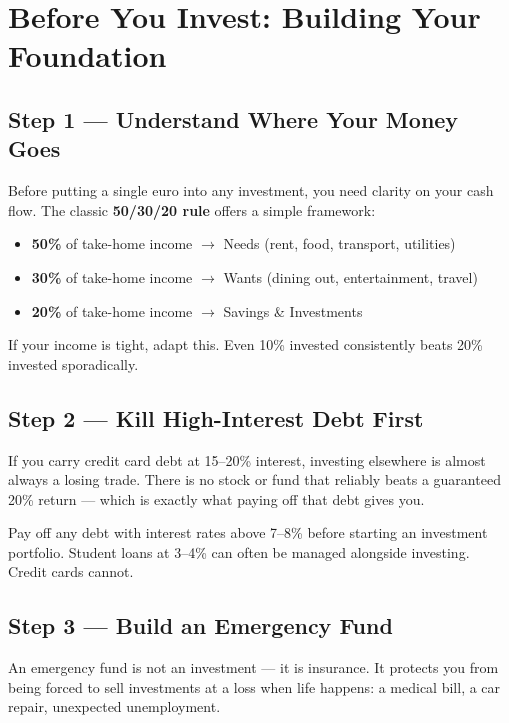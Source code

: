 \documentclass[12pt, a4paper]{book}
\begin{document}
\chapter{Before You Invest: Building Your Foundation}

\section{Step 1 --- Understand Where Your Money Goes}

Before putting a single euro into any investment, you need clarity on your cash flow. The classic \textbf{50/30/20 rule} offers a simple framework:

\begin{itemize}[leftmargin=1.5cm]
  \item \textbf{50\%} of take-home income $\rightarrow$ Needs (rent, food, transport, utilities)
  \item \textbf{30\%} of take-home income $\rightarrow$ Wants (dining out, entertainment, travel)
  \item \textbf{20\%} of take-home income $\rightarrow$ Savings \& Investments
\end{itemize}

If your income is tight, adapt this. Even 10\% invested consistently beats 20\% invested sporadically.

\section{Step 2 --- Kill High-Interest Debt First}

If you carry credit card debt at 15--20\% interest, investing elsewhere is almost always a losing trade. There is no stock or fund that reliably beats a guaranteed 20\% return --- which is exactly what paying off that debt gives you.

\begin{warningbox}
Pay off any debt with interest rates above 7--8\% before starting an investment portfolio. Student loans at 3--4\% can often be managed alongside investing. Credit cards cannot.
\end{warningbox}

\section{Step 3 --- Build an Emergency Fund}

An emergency fund is not an investment --- it is insurance. It protects you from being forced to sell investments at a loss when life happens: a medical bill, a car repair, unexpected unemployment.
\end{document}
